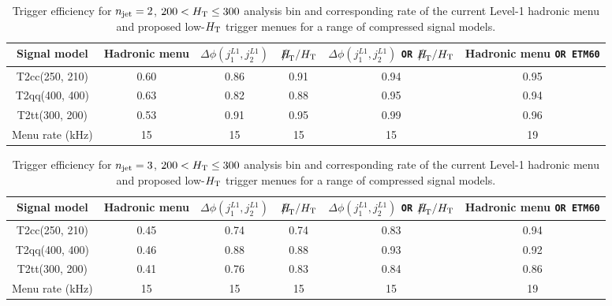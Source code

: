 \begin{table}[h!]
\footnotesize
\centering
\begin{tabular}{cccccc} 
\hline
\hline
  Signal model & Hadronic menu & $\Delta\phi(j_{1}^{L1},j_{2}^{L1})$ & $\mht/\scalht$ &$\Delta\phi(j_{1}^{L1},j_{2}^{L1})$ \verb!OR! $\mht/\scalht$ & Hadronic menu \verb!OR ETM60! \\
\hline
  T2cc(250, 210)   & 0.60 & 0.86 & 0.91 & 0.94 & 0.95 \\
  T2qq(400, 400)   & 0.63 & 0.82 & 0.88 & 0.95 & 0.94 \\
  T2tt(300, 200)   & 0.53 & 0.91 & 0.95 & 0.99 & 0.96 \\
\hline
  Menu rate (kHz) & 15   & 15   & 15   & 15   & 19   \\
\hline
\hline
\end{tabular}
\caption{Trigger efficiency for $n_{\text{jet}} = 2$, $200 < \mbox{$H_\text{T}$} \le 300$ analysis bin and corresponding rate of the current Level-1 hadronic menu and proposed low-$\mbox{$H_\text{T}$}$ trigger menues for a range of compressed signal models.} %
\label{tab:LowHT_Seed_Signal_2Jet}
\end{table}

\begin{table}[h!]
\footnotesize
\centering
\begin{tabular}{cccccc} 
\hline
\hline
  Signal model & Hadronic menu & $\Delta\phi(j_{1}^{L1},j_{2}^{L1})$ & $\mht/\scalht$ &$\Delta\phi(j_{1}^{L1},j_{2}^{L1})$ \verb!OR! $\mht/\scalht$ & Hadronic menu \verb!OR ETM60! \\
\hline
  T2cc(250, 210)   & 0.45 & 0.74 & 0.74 & 0.83 & 0.94 \\
  T2qq(400, 400)   & 0.46 & 0.88 & 0.88 & 0.93 & 0.92 \\
  T2tt(300, 200)   & 0.41 & 0.76 & 0.83 & 0.84 & 0.86 \\
\hline
  Menu rate (kHz) & 15   & 15   & 15   & 15   & 19   \\
\hline
\hline
\end{tabular}
\caption{Trigger efficiency for $n_{\text{jet}} = 3$, $200 < \mbox{$H_\text{T}$} \le 300$ analysis bin and corresponding rate of the current Level-1 hadronic menu and proposed low-$\mbox{$H_\text{T}$}$ trigger menues for a range of compressed signal models.} %
\label{tab:LowHT_Seed_Signal_3Jet}
\end{table}




